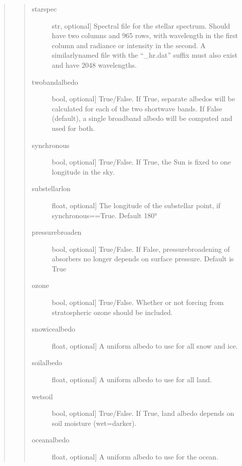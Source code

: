 \documentclass[letterpaper,10pt,english]{sphinxmanual}
\begin{document}
\begin{fulllineitems}
\begin{fulllineitems}
\begin{quote}
\begin{quote}
\begin{description}
\item[{starspec}] \leavevmode{[}str, optional{]}
Spectral file for the stellar spectrum. Should have two columns and 965 rows,
with wavelength in the first column and radiance or intensity in the second.
A similarly\sphinxhyphen{}named file with the “\_hr.dat” suffix must also exist and have
2048 wavelengths.

\item[{twobandalbedo}] \leavevmode{[}bool, optional{]}
True/False. If True, separate albedos will be calculated for each of the
two shortwave bands. If False (default), a single broadband albedo will be
computed and used for both.

\item[{synchronous}] \leavevmode{[}bool, optional{]}
True/False. If True, the Sun is fixed to one longitude in the sky.

\item[{substellarlon}] \leavevmode{[}float, optional{]}
The longitude of the substellar point, if synchronous==True. Default 180°

\item[{pressurebroaden}] \leavevmode{[}bool, optional{]}
True/False. If False, pressure\sphinxhyphen{}broadening of absorbers no longer depends
on surface pressure. Default is True

\item[{ozone}] \leavevmode{[}bool, optional{]}
True/False. Whether or not forcing from stratospheric ozone should be included.

\item[{snowicealbedo}] \leavevmode{[}float, optional{]}
A uniform albedo to use for all snow and ice.

\item[{soilalbedo}] \leavevmode{[}float, optional{]}
A uniform albedo to use for all land.

\item[{wetsoil}] \leavevmode{[}bool, optional{]}
True/False. If True, land albedo depends on soil moisture (wet=darker).

\item[{oceanalbedo}] \leavevmode{[}float, optional{]}
A uniform albedo to use for the ocean.


\end{description}
\end{quote}
\end{quote}
\end{fulllineitems}
\end{fulllineitems}
\end{document}
